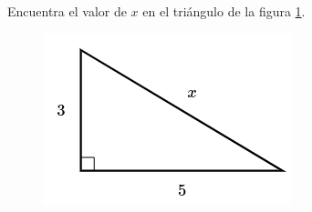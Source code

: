 Encuentra el valor de $x$ en el triángulo de la figura \ref{fig:lados_pitagoras_14}.

\begin{minipage}[t][][t]{0.35\textwidth}
    \begin{figure}[H]
        \centering
        \includegraphics[width=0.9\linewidth]{../images/lados_pitagoras_14.png}

        \caption{}
        \label{fig:lados_pitagoras_14}
    \end{figure}
\end{minipage}\hfill
